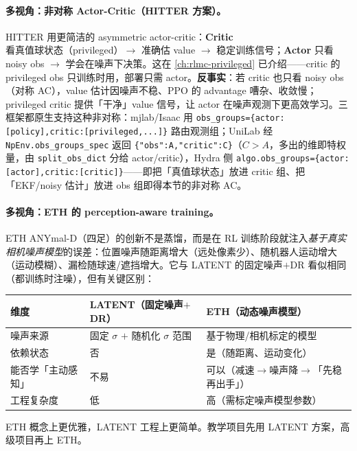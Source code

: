 \paragraph{多视角：非对称 Actor-Critic（HITTER 方案）。}HITTER 用更简洁的 asymmetric actor-critic\cite{tennis_hitter2025}：\textbf{Critic} 看真值球状态（privileged）$\to$ 准确估 value $\to$ 稳定训练信号；\textbf{Actor} 只看 noisy obs $\to$ 学会在噪声下决策。这在 \cref{ch:rlmc-privileged} 已介绍——critic 的 privileged obs 只训练时用，部署只需 actor。\textbf{反事实}：若 critic 也只看 noisy obs（对称 AC），value 估计因噪声不稳、PPO 的 advantage 嘈杂、收敛慢；privileged critic 提供「干净」value 信号，让 actor 在噪声观测下更高效学习。三框架都原生支持这种非对称：mjlab/Isaac 用 \texttt{obs\_groups=\{actor:[policy],critic:[privileged,...]\}} 路由观测组；UniLab 经 \texttt{NpEnv.\allowbreak obs\_groups\_spec} 返回 \texttt{\{"obs":A,"critic":C\}}（$C>A$，多出的维即特权量，由 \texttt{split\_obs\_dict} 分给 actor/critic），Hydra 侧 \texttt{algo.obs\_groups=\{actor:[actor],critic:[critic]\}}——即把「真值球状态」放进 critic 组、把「EKF/noisy 估计」放进 obs 组即得本节的非对称 AC。

\paragraph{多视角：ETH 的 perception-aware training。}ETH ANYmal-D（四足）的创新不是蒸馏，而是在 RL 训练阶段就注入\emph{基于真实相机噪声模型}的误差\cite{tennis_eth2025badminton}：位置噪声随距离增大（远处像素少）、随机器人运动增大（运动模糊）、漏检随球速/遮挡增大。它与 LATENT 的固定噪声$+$DR 看似相同（都训练时注噪），但有关键区别：

\begin{center}
\small
\begin{tabular}{@{}lll@{}}
\toprule
维度 & LATENT（固定噪声$+$DR） & ETH（动态噪声模型） \\
\midrule
噪声来源 & 固定 $\sigma$ $+$ 随机化 $\sigma$ 范围 & 基于物理/相机标定的模型 \\
依赖状态 & 否 & 是（随距离、运动变化） \\
能否学「主动感知」 & 不易 & 可以（减速$\to$噪声降$\to$「先稳再出手」） \\
工程复杂度 & 低 & 高（需标定噪声模型参数） \\
\bottomrule
\end{tabular}
\end{center}

ETH 概念上更优雅，LATENT 工程上更简单。教学项目先用 LATENT 方案，高级项目再上 ETH。

